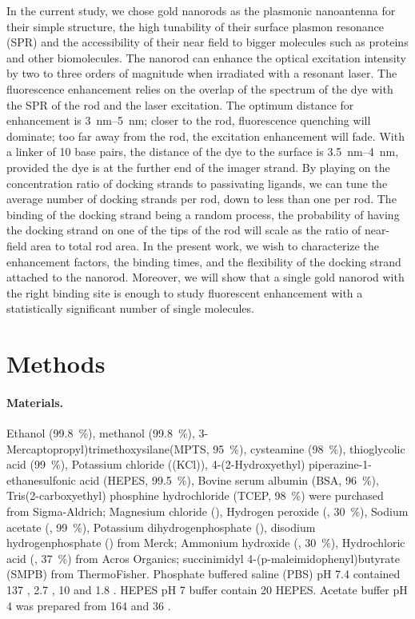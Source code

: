 In the current study, we chose gold nanorods as the plasmonic nanoantenna for their simple structure, the high tunability of their surface plasmon resonance (SPR) and the accessibility of their near field to bigger molecules such as proteins and other biomolecules.
The nanorod can enhance the optical excitation intensity by two to three orders of magnitude when irradiated with a resonant laser.
The fluorescence enhancement relies on the overlap of the spectrum of the dye with the SPR of the rod and the laser excitation.
The optimum distance for enhancement is \SIrange{3}{5}{\nm}; closer to the rod, fluorescence quenching will dominate; too far away from the rod, the excitation enhancement will fade.\cite{khatua2014resonant}
With a linker of 10 base pairs, the distance of the dye to the surface is \SIrange{3.5}{4}{\nm}, provided the dye is at the further end of the imager strand.
By playing on the concentration ratio of docking strands to passivating ligands, we can tune the average number of docking strands per rod, down to less than one per rod. The binding of the docking strand being a random process, the probability of having the docking strand on one of the tips of the rod will scale as the ratio of near-field area to total rod area.
In the present work, we wish to characterize the enhancement factors, the binding times, and the flexibility of the docking strand attached to the nanorod. Moreover, we will show that a single gold nanorod with the right binding site is enough to study fluorescent enhancement with a statistically significant number of single molecules.

\section{Methods}
\paragraph*{Materials.} Ethanol (\SI{99.8}{\percent}), methanol (\SI{99.8}{\percent}), 3-Mercaptopropyl)trimethoxysilane(MPTS, \SI{95}{\percent}), cysteamine (\SI{98}{\percent}), thioglycolic acid (\SI{99}{\percent}), Potassium chloride (\ce(KCl)), 4-(2-Hydroxyethyl) piperazine-1-ethanesulfonic acid (HEPES, \SI{99.5}{\percent}), Bovine serum albumin (BSA, \SI{96}{\percent}), Tris(2-carboxyethyl) phosphine hydrochloride (TCEP, \SI{98}{\percent}) were purchased from Sigma-Aldrich; 
Magnesium chloride (), Hydrogen peroxide (, \SI{30}{\percent}), Sodium acetate (, \SI{99}{\percent}), Potassium dihydrogenphosphate (), disodium hydrogenphosphate () from Merck;
Ammonium hydroxide (, \SI{30}{\percent}), Hydrochloric acid (, \SI{37}{\percent}) from Acros Organics;
succinimidyl 4-(p-maleimidophenyl)butyrate (SMPB) from ThermoFisher.
Phosphate buffered saline (PBS) pH 7.4 contained \SI{137}{\mM} , \SI{2.7}{\mM} , \SI{10}{\mM}  and \SI{1.8}{\mM} .
HEPES pH 7 buffer contain \SI{20}{\mM} HEPES. Acetate buffer pH 4 was prepared from \SI{164}{\mM}  and \SI{36}{\mM} .


